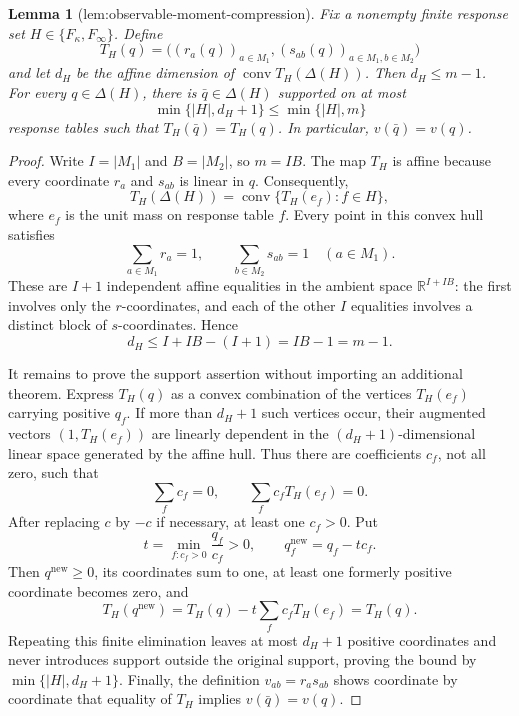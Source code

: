 \documentclass{article}
\newtheorem{lemma}{Lemma}
\begin{document}
\begin{lemma}[lem:observable-moment-compression]\label{lem:observable-moment-compression}
Fix a nonempty finite response set \(H\in\{F_\kappa,F_\infty\}\).  Define
\[
 T_H(q)=\bigl((r_a(q))_{a\in M_1},(s_{ab}(q))_{a\in M_1,b\in M_2}\bigr)
\]
and let \(d_H\) be the affine dimension of \(\operatorname{conv}T_H(\Delta(H))\).  Then \(d_H\le m-1\).  For every \(q\in\Delta(H)\), there is \(\bar q\in\Delta(H)\) supported on at most
\[
 \min\{|H|,d_H+1\}\le\min\{|H|,m\}
\]
response tables such that \(T_H(\bar q)=T_H(q)\).  In particular, \(v(\bar q)=v(q)\).
\end{lemma}
\begin{proof}
Write \(I=|M_1|\) and \(B=|M_2|\), so \(m=IB\).  The map \(T_H\) is affine because every coordinate \(r_a\) and \(s_{ab}\) is linear in \(q\).  Consequently,
\[
 T_H(\Delta(H))
 =\operatorname{conv}\{T_H(e_f):f\in H\},
\]
where \(e_f\) is the unit mass on response table \(f\).  Every point in this convex hull satisfies
\[
 \sum_{a\in M_1}r_a=1,
 \qquad
 \sum_{b\in M_2}s_{ab}=1\quad(a\in M_1).
\]
These are \(I+1\) independent affine equalities in the ambient space \(\mathbb R^{I+IB}\): the first involves only the \(r\)-coordinates, and each of the other \(I\) equalities involves a distinct block of \(s\)-coordinates.  Hence
\[
 d_H\le I+IB-(I+1)=IB-1=m-1.
\]

It remains to prove the support assertion without importing an additional theorem.  Express \(T_H(q)\) as a convex combination of the vertices \(T_H(e_f)\) carrying positive \(q_f\).  If more than \(d_H+1\) such vertices occur, their augmented vectors \((1,T_H(e_f))\) are linearly dependent in the \((d_H+1)\)-dimensional linear space generated by the affine hull.  Thus there are coefficients \(c_f\), not all zero, such that
\[
 \sum_f c_f=0,
 \qquad
 \sum_f c_fT_H(e_f)=0.
\]
After replacing \(c\) by \(-c\) if necessary, at least one \(c_f>0\).  Put
\[
 t=\min_{f:c_f>0}\frac{q_f}{c_f}>0,
 \qquad
 q_f^{\mathrm{new}}=q_f-tc_f.
\]
Then \(q^{\mathrm{new}}\ge0\), its coordinates sum to one, at least one formerly positive coordinate becomes zero, and
\[
 T_H(q^{\mathrm{new}})=T_H(q)-t\sum_fc_fT_H(e_f)=T_H(q).
\]
Repeating this finite elimination leaves at most \(d_H+1\) positive coordinates and never introduces support outside the original support, proving the bound by \(\min\{|H|,d_H+1\}\).  Finally, the definition \(v_{ab}=r_as_{ab}\) shows coordinate by coordinate that equality of \(T_H\) implies \(v(\bar q)=v(q)\).
\end{proof}
\end{document}
